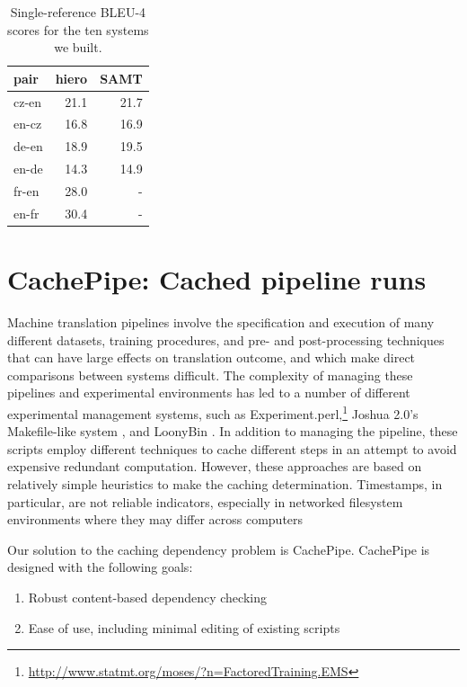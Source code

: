 \documentclass[11pt]{article}
\begin{document}
\begin{table}[t]
  \centering
  \begin{tabular}{l|rr}
    pair   & hiero & SAMT \\
    \hline\hline
    cz-en  & 21.1  & 21.7 \\
    en-cz  & 16.8  & 16.9 \\
    de-en  & 18.9  & 19.5 \\
    en-de  & 14.3  & 14.9 \\
    fr-en  & 28.0  & - \\
    en-fr  & 30.4  & - \\
  \end{tabular}
  \caption{Single-reference BLEU-4 scores for the ten systems we
    built.  }
  \label{table:results}
\end{table}

\section{CachePipe: Cached pipeline runs}

Machine translation pipelines involve the specification and execution
of many different datasets, training procedures, and pre- and
post-processing techniques that can have large effects on translation
outcome, and which make direct comparisons between systems difficult.
The complexity of managing these pipelines and experimental
environments has led to a number of different experimental management
systems, such as
Experiment.perl,\footnote{\url{http://www.statmt.org/moses/?n=FactoredTraining.EMS}}
Joshua 2.0's Makefile-like system \cite{li2010joshua}, and LoonyBin
\cite{clark2010loonybin}.  In addition to managing the pipeline, these
scripts employ different techniques to cache different steps in an
attempt to avoid expensive redundant computation.  However, these
approaches are based on relatively simple heuristics to make the
caching determination.  Timestamps, in particular, are not reliable
indicators, especially in networked filesystem environments where
they may differ across computers

Our solution to the caching dependency problem is CachePipe.
CachePipe is designed with the following goals:

\begin{enumerate}
\item Robust content-based dependency checking
\item Ease of use, including minimal editing of existing scripts
\end{enumerate}
\end{document}
